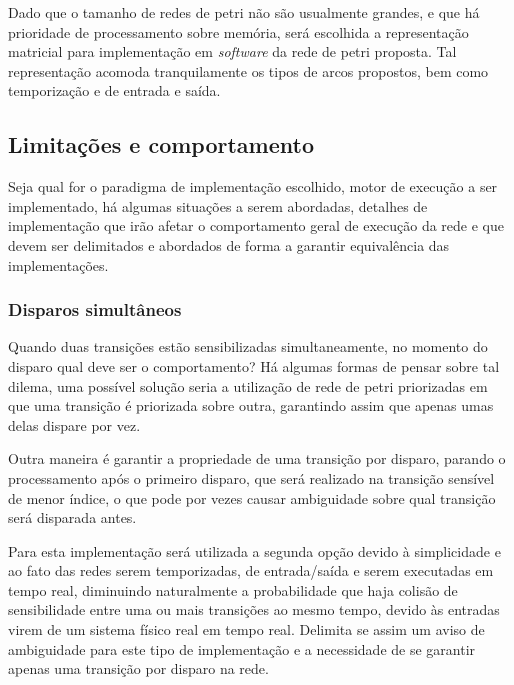 Dado que o tamanho de redes de petri não são usualmente grandes, e que há prioridade de processamento sobre memória, será escolhida a representação matricial para implementação em \textit{software} da rede de petri proposta. Tal representação acomoda tranquilamente os tipos de arcos propostos, bem como temporização e de entrada e saída.



\subsection{Limitações e comportamento}
\label{section:limitations}

Seja qual for o paradigma de implementação escolhido, motor de execução a ser implementado, há algumas situações a serem abordadas, detalhes de implementação que irão afetar o comportamento geral de execução da rede e que devem ser delimitados e abordados de forma a garantir equivalência das implementações.

\subsubsection{Disparos simultâneos}

Quando duas transições estão sensibilizadas simultaneamente, no momento do disparo qual deve ser o comportamento? Há algumas formas de pensar sobre tal dilema, uma possível solução seria a utilização de rede de petri priorizadas em que uma transição é priorizada sobre outra, garantindo assim que apenas umas delas dispare por vez.

Outra maneira é garantir a propriedade de uma transição por disparo, parando o processamento após o primeiro disparo, que será realizado na transição sensível de menor índice, o que pode por vezes causar ambiguidade sobre qual transição será disparada antes.

Para esta implementação será utilizada a segunda opção devido à simplicidade e ao fato das redes serem temporizadas, de entrada/saída e serem executadas em tempo real, diminuindo naturalmente a probabilidade que haja colisão de sensibilidade entre uma ou mais transições ao mesmo tempo, devido às entradas virem de um sistema físico real em tempo real. Delimita se assim um aviso de ambiguidade para este tipo de implementação e a necessidade de se garantir apenas uma transição por disparo na rede.

